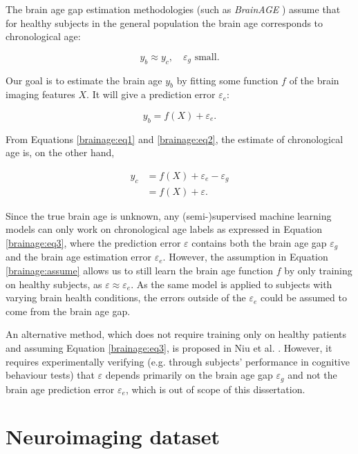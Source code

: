 The brain age gap estimation methodologies (such as \textit{BrainAGE} \cite{franke2019ten}) assume that for healthy subjects in the general population the brain age corresponds to chronological age:

\begin{equation}
    \label{brainage:assume}
    y_b \approx y_c,\quad \varepsilon_g \text{ small}.
\end{equation}

Our goal is to estimate the brain age $y_b$ by fitting some function $f$ of the brain imaging features $X$. It will give a prediction error $\varepsilon_e$:

\begin{equation}
    \label{brainage:eq2}
    y_b = f(X) + \varepsilon_e.
\end{equation}

From Equations \ref{brainage:eq1} and \ref{brainage:eq2}, the estimate of chronological age is, on the other hand,

\begin{align}
    y_c &= f(X) + \varepsilon_e - \varepsilon_g \\
        \label{brainage:eq3}
        &= f(X) + \varepsilon.
\end{align}

Since the true brain age is unknown, any (semi-)supervised machine learning models can only work on chronological age labels as expressed in Equation \ref{brainage:eq3}, where the prediction error $\varepsilon$ contains both the brain age gap $\varepsilon_g$ and the brain age estimation error $\varepsilon_e$. However, the assumption in Equation \ref{brainage:assume} allows us to still learn the brain age function $f$ by only training on healthy subjects, as $\varepsilon \approx \varepsilon_e$. As the same model is applied to subjects with varying brain health conditions, the errors outside of the $\varepsilon_e$ could be assumed to come from the brain age gap.  

An alternative method, which does not require training only on healthy patients and assuming Equation \ref{brainage:eq3}, is proposed in Niu et al. \cite{niu2019improved}. However, it requires experimentally verifying (e.g. through subjects' performance in cognitive behaviour tests) that $\varepsilon$ depends primarily on the brain age gap $\varepsilon_g$ and not the brain age prediction error $\varepsilon_e$, which is out of scope of this dissertation.

\section{Neuroimaging dataset}
\label{dataset}

